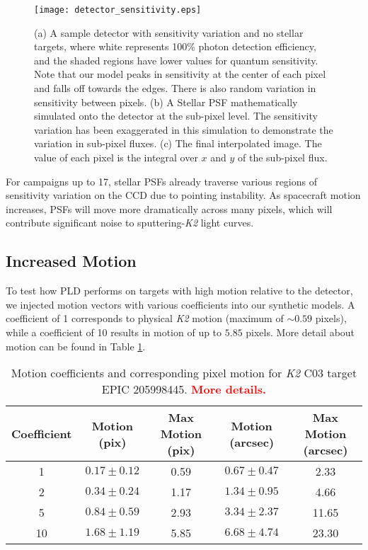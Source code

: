 \documentclass[12pt,preprint]{aastex}
\begin{document}
\begin{figure}[h]
	\centering
	\texttt{[image: detector\_sensitivity.eps]}
	\caption{(a) A sample detector with sensitivity variation and no stellar targets, where white represents 100\% photon detection efficiency, and the shaded regions have lower values for quantum sensitivity. Note that our model peaks in sensitivity at the center of each pixel and falls off towards the edges. There is also random variation in sensitivity between pixels. (b) A Stellar PSF mathematically simulated onto the detector at the sub-pixel level. The sensitivity variation has been exaggerated in this simulation to demonstrate the variation in sub-pixel fluxes. (c) The final interpolated image. The value of each pixel is the integral over $x$ and $y$ of the sub-pixel flux.}
	\label{fig:detector_sensitivity}
\end{figure}

For campaigns up to 17, stellar PSFs already traverse various regions of sensitivity variation on the CCD due to pointing instability. As spacecraft motion increases, PSFs will move more dramatically across many pixels, which will contribute significant noise to sputtering-\textit{K2} light curves.

\subsection{Increased Motion}

To test how PLD performs on targets with high motion relative to the detector, we injected motion vectors with various coefficients into our synthetic models. A coefficient of 1 corresponds to physical \textit{K2} motion (maximum of $\sim 0.59$ pixels), while a coefficient of 10 results in motion of up to $5.85$ pixels. More detail about motion can be found in Table \ref{table:motionstatistics}.

\begin{table}[h!]
\begin{center}
    \begin{tabular}{c | c | c | c | c}
        Coefficient & Motion (pix) & Max Motion (pix) & Motion (arcsec) & Max Motion (arcsec) \\
        \hline \hline
        1 & $0.17\pm0.12$ & 0.59 & $0.67\pm0.47$ & 2.33 \\
        2 & $0.34\pm0.24$ & 1.17 & $1.34\pm0.95$ & 4.66 \\
				5 & $0.84\pm0.59$ & 2.93 & $3.34\pm2.37$ & 11.65 \\
				10 & $1.68\pm1.19$ & 5.85 & $6.68\pm4.74$ & 23.30 \\
   \end{tabular}
	 \caption{Motion coefficients and corresponding pixel motion for \textit{K2} C03 target EPIC 205998445. \textcolor{red}{\textbf{More details.}}}
	 \label{table:motionstatistics}
\end{center}
\end{table}
\end{document}
